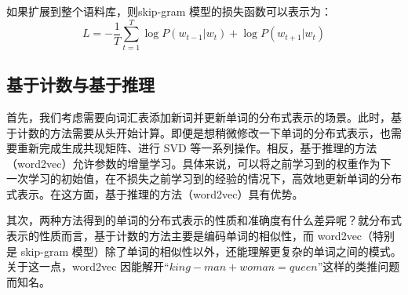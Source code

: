 如果扩展到整个语料库，则skip-gram 模型的损失函数可以表示为：
\begin{equation}
    L=-\frac{1}{T}\sum_{t=1}^{T}\log P(w_{t-1}|w_t)+\log P(w_{t+1}|w_t)
\end{equation}
\subsection{基于计数与基于推理}
首先，我们考虑需要向词汇表添加新词并更新单词的分布式表示的场景。此时，基于计数的方法需要从头开始计算。即便是想稍微修改一下单词的分布式表示，也需要重新完成生成共现矩阵、进行 SVD 等一系列操作。相反，基于推理的方法（word2vec）允许参数的增量学习。具体来说，可以将之前学习到的权重作为下一次学习的初始值，在不损失之前学习到的经验的情况下，高效地更新单词的分布式表示。在这方面，基于推理的方法（word2vec）具有优势。

其次，两种方法得到的单词的分布式表示的性质和准确度有什么差异呢？就分布式表示的性质而言，基于计数的方法主要是编码单词的相似性，而 word2vec（特别是 skip-gram 模型）除了单词的相似性以外，还能理解更复杂的单词之间的模式。关于这一点，word2vec 因能解开“$king - man + woman = queen$”这样的类推问题而知名。